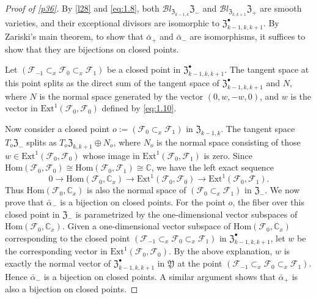 \documentclass{amsart}
\numberwithin{equation}{section}
\newcommand\mc{\mathcal}
\newcommand\mf{\mathfrak}
\newcommand\mb{\mathbb}
\theoremstyle{definition}
\theoremstyle{remark}
\begin{document}
\begin{proof}[Proof of \cref{p36}] By \cref{l28} and \cref{eq:1.8}, both $\mc{B}l_{\mf{Z}_{k-1,k}}\mf{Z}_{-}$ and $\mc{B}l_{\mf{Z}_{k,k+1}}\mf{Z}_{+}$ are smooth varieties, and their exceptional divisors are isomorphic to $\mf{Z}_{k-1,k,k+1}^{\bullet}$. By Zariski's main theorem, to show that $\bar{\alpha}_{+}$ and $\bar{\alpha}_{-}$ are isomorphisms, it suffices to show that they are bijections on closed points.

Let $(\mc{F}_{-1}\subset_x\mc{F}_0\subset_x \mc{F}_1)$ be a closed point in $\mf{Z}_{k-1,k,k+1}^{\bullet}$. The tangent space at this point splits as the direct sum of the tangent space of $\mf{Z}_{k-1,k,k+1}^{\bullet}$ and $N$, where $N$ is the normal space generated by the vector $(0,w,-w,0)$, and $w$ is the vector in $\mathrm{Ext}^1(\mc{F}_0,\mc{F}_0)$ defined by \cref{eq:1.10}. 

Now consider a closed point $o:=(\mc{F}_0\subset_x \mc{F}_1)$ in $\mf{Z}_{k-1,k}$. The tangent space $T_o\mf{Z}_-$ splits as $T_o\mf{Z}_{k,k+1}\oplus N_o$, where $N_o$ is the normal space consisting of those $w\in \mathrm{Ext}^1(\mc{F}_0,\mc{F}_0)$ whose image in $\mathrm{Ext}^1(\mc{F}_0,\mc{F}_1)$ is zero. Since $\mathrm{Hom}(\mc{F}_0,\mc{F}_0)\cong \mathrm{Hom}(\mc{F}_0,\mc{F}_1)\cong \mathbb{C}$, we have the left exact sequence
\begin{equation*}
  0\to \mathrm{Hom}(\mc{F}_0,\mb{C}_x)\to \mathrm{Ext}^1(\mc{F}_0,\mc{F}_0)\to \mathrm{Ext}^1(\mc{F}_0,\mc{F}_1).
\end{equation*}
Thus $\mathrm{Hom}(\mc{F}_0,\mb{C}_x)$ is also the normal space of $(\mc{F}_0\subset_x\mc{F}_1)$ in $\mf{Z}_-$. We now prove that $\bar{\alpha}_-$ is a bijection on closed points. For the point $o$, the fiber over this closed point in $\mf{Z}_-$ is parametrized by the one-dimensional vector subspaces of $\mathrm{Hom}(\mc{F}_0,\mathbb{C}_x)$. Given a one-dimensional vector subspace of $\mathrm{Hom}(\mc{F}_0,\mb{C}_x)$ corresponding to the closed point $(\mc{F}_{-1}\subset_x\mc{F}_0\subset_x \mc{F}_1)$ in $\mf{Z}_{k-1,k,k+1}^{\bullet}$, let $w$ be the corresponding vector in $\mathrm{Ext}^1(\mc{F}_0,\mc{F}_0)$. By the above explanation, $w$ is exactly the normal vector of $\mf{Z}_{k-1,k,k+1}^{\bullet}$ in $\mf{Y}$ at the point $(\mc{F}_{-1}\subset_x\mc{F}_0\subset_x \mc{F}_1)$. Hence $\bar{\alpha}_-$ is a bijection on closed points. A similar argument shows that $\bar{\alpha}_+$ is also a bijection on closed points.

\end{proof}
\end{document}

